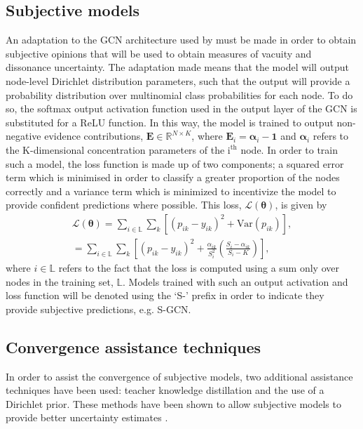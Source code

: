\documentclass[
twocolumn,
]{ceurart}
\begin{document}
\subsection{Subjective models}
An adaptation to the GCN architecture used by \cite{Kipf2017} must be made in order to obtain subjective opinions that will be used to obtain measures of vacuity and dissonance uncertainty.
The adaptation made means that the model will output node-level Dirichlet distribution parameters, such that the output will provide a probability distribution over multinomial class probabilities for each node.
To do so, the softmax output activation function used in the output layer of the GCN is substituted for a ReLU function.
In this way, the model is trained to output non-negative evidence contributions, $\mathbf{E}\in\mathbb{R}^{N\times K}$, where $\mathbf{E}_{i} = \boldsymbol{\alpha}_{i}-\mathbf{1}$ and $\boldsymbol{\alpha}_{i}$ refers to the K-dimensional concentration parameters of the $\text{i}^\text{th}$ node.
In order to train such a model, the loss function is made up of two components; a squared error term which is minimised in order to classify a greater proportion of the nodes correctly and a variance term which is minimized to incentivize the model to provide confident predictions where possible.
This loss, $\mathcal{L}(\boldsymbol{\theta})$, is given by
\begin{equation}
\begin{split}
    \mathcal{L}(\boldsymbol{\theta})=\sum_{i\in\mathbb{L}}\sum_k \left[(p_{ik}-y_{ik})^2+\text{Var}(p_{ik})\right],\\
    =\sum_{i\in\mathbb{L}}\sum_k \left[(p_{ik}-y_{ik})^2+\frac{\alpha_{ik}}{S_i^2}\left(\frac{S_i-\alpha_{ik}}{S_i-K}\right)\right],
\end{split}
\label{eq:core_loss}
\end{equation}
where $i\in\mathbb{L}$ refers to the fact that the loss is computed using a sum only over nodes in the training set, $\mathbb{L}$.
Models trained with such an output activation and loss function will be denoted using the `S-' prefix in order to indicate they provide subjective predictions, e.g. S-GCN.

\subsection{Convergence assistance techniques}
In order to assist the convergence of subjective models, two additional assistance techniques have been used: teacher knowledge distillation and the use of a Dirichlet prior.
These methods have been shown to allow subjective models to provide better uncertainty estimates \cite{ZhaoXujiang2020}.
\end{document}
